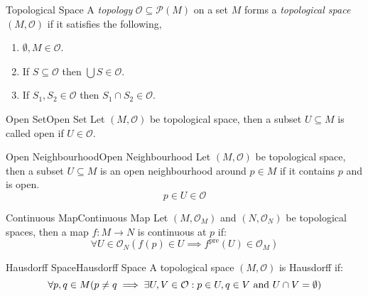 \documentclass{article}
\newcommand{\tp}{\mathcal{O}}
\newcommand{\pset}[1]{\mathcal{P}(#1)}
\begin{document}
\begin{definition}{Topological Space}{}
    A \emph{topology} $\tp \subseteq \pset{M}$ on a set $M$ forms a \emph{topological space} $(M, \tp)$ if it satisfies the following,

    \begin{enumerate}[label=(\roman*)]
        \item $\emptyset, M \in \tp$.
        \item If $S \subseteq \tp$ then $\bigcup S \in \tp$.
        \item If $S_1, S_2 \in \tp$ then $S_1 \cap S_2 \in \tp$.
    \end{enumerate}
\end{definition}

\begin{terminology}{Open Set}{Open Set}
    Let $(M, \tp)$ be topological space, then a subset $U \subseteq M$ is called open if $U \in \tp$.
\end{terminology}

\begin{terminology}{Open Neighbourhood}{Open Neighbourhood}
    Let $(M, \tp)$ be topological space, then a subset $U \subseteq M$ is an open neighbourhood around $p \in M$ if it contains $p$ and is open.
    $$p \in U \in \tp$$
\end{terminology}

\begin{definition}{Continuous Map}{Continuous Map}
    Let $(M, \tp_M)$ and $(N, \tp_N)$ be topological spaces, then a map $f: M \to N$ is continuous at $p$ if:
    $$\forall U \in \tp_N \left(f(p) \in U \implies f^{\text{pre}}(U) \in \tp_M\right)$$
\end{definition}

\begin{definition}{Hausdorff Space}{Hausdorff Space}
    A topological space $(M, \tp)$ is Hausdorff if:
    $$\forall p, q \in M (p \neq q \implies \exists U, V \in \tp : p \in U, q \in V \tand U \cap V = \emptyset)$$

\end{definition}
\end{document}
